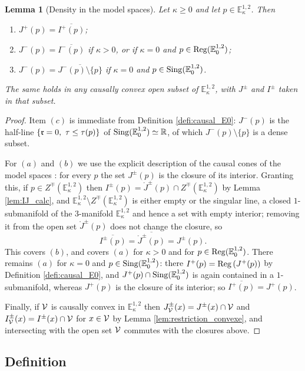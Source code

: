 \documentclass[a4paper,twoside]{article}
\newcommand{\mass}[1]{\mathbb{E}^{1,2}_{#1}}
\newtheorem{lem}{Lemma}[section]
\begin{document}
\begin{lem}[Density in the model spaces]\label{lem:densite_modele}
Let $\kappa\geq 0$ and let $p\in \mass{\kappa}$. Then
\begin{enumerate}[label=(\alph*)]
\item $J^+(p)=\overline{I^+(p)}$;
\item $J^-(p)=\overline{I^-(p)}$ if $\kappa>0$, or if $\kappa=0$ and $p\in \reg(\mass{0})$;
\item $J^-(p)=\overline{J^-(p)\setminus\{p\}}$ if $\kappa=0$ and $p\in \sing(\mass{0})$.
\end{enumerate}
The same holds in any causally convex open subset of $\mass{\kappa}$, with $J^\pm$ and $I^\pm$ taken
in that subset.
\end{lem}
\begin{proof}
Item $(c)$ is immediate from Definition \ref{defi:causal_E0}: $J^-(p)$ is the half-line
$\{\mathfrak{r}=0,~\tau\leq \tau(p)\}$ of $\sing(\mass{0})\simeq \RR$, of which $J^-(p)\setminus\{p\}$ is a
dense subset.

For $(a)$ and $(b)$ we use the explicit description of the causal cones of the model spaces
\cite[Section~1.2]{brunswic2021cauchy}: for every $p$ the set $J^\pm(p)$ is the closure of its
interior. Granting this, if $p\in Z^\mp(\mass{\kappa})$ then $I^\pm(p)=\ring J^\pm(p)\cap
Z^\mp(\mass{\kappa})$ by Lemma \ref{lem:IJ_calc}, and $\mass{\kappa}\setminus
Z^\mp(\mass{\kappa})$ is either empty or the singular line, a closed $1$-submanifold of the
$3$-manifold $\mass{\kappa}$ and hence a set with empty interior; removing it from the open set
$\ring J^\pm(p)$ does not change the closure, so
$$\overline{I^\pm(p)}=\overline{\ring J^\pm(p)}=J^\pm(p).$$
This covers $(b)$, and covers $(a)$ for $\kappa>0$ and for $p\in \reg(\mass 0)$. There remains $(a)$
for $\kappa=0$ and $p\in \sing(\mass{0})$: there $I^+(p)=\mathrm{Reg}\left(J^+(p)\right)$ by Definition
\ref{defi:causal_E0}, and $J^+(p)\cap \sing(\mass{0})$ is again contained in a $1$-submanifold,
whereas $J^+(p)$ is the closure of its interior; so $\overline{I^+(p)}=J^+(p)$.

Finally, if $\mathcal V$ is causally convex in $\mass{\kappa}$ then $J^\pm_\mathcal V(x)=J^\pm(x)\cap \mathcal V$ and
$I^\pm_\mathcal V(x)=I^\pm(x)\cap \mathcal V$ for $x\in \mathcal V$ by Lemma \ref{lem:restriction_convexe}, and intersecting
with the open set $\mathcal V$ commutes with the closures above.
\end{proof}

\subsection{Definition}
\end{document}
